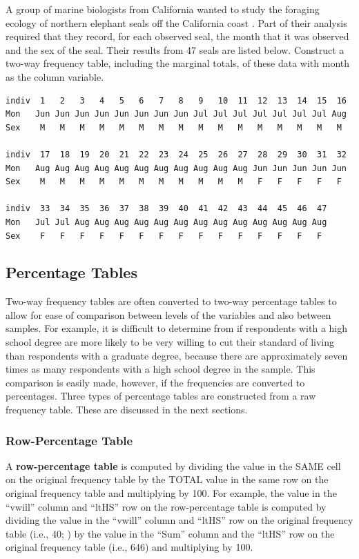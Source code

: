 \documentclass[10pt,openany]{book}\usepackage[]{graphicx}\usepackage[]{color}
\begin{document}
\vspace{-12pt}
\begin{exsection}
  \item \label{revex:cbEDASeal1} A group of marine biologists from California wanted to study the foraging ecology of northern elephant seals off the California coast \citep{LeBoeufetal2000}.  Part of their analysis required that they record, for each observed seal, the month that it was observed and the sex of the seal.  Their results from 47 seals are listed below.  Construct a two-way frequency table, including the marginal totals, of these data with month as the column variable. 
\begin{Verbatim}
indiv  1   2   3   4   5   6   7   8   9   10  11  12  13  14  15  16
Mon   Jun Jun Jun Jun Jun Jun Jun Jun Jul Jul Jul Jul Jul Jul Jul Aug
Sex    M   M   M   M   M   M   M   M   M   M   M   M   M   M   M   M

indiv  17  18  19  20  21  22  23  24  25  26  27  28  29  30  31  32
Mon   Aug Aug Aug Aug Aug Aug Aug Aug Aug Aug Aug Jun Jun Jun Jun Jun
Sex    M   M   M   M   M   M   M   M   M   M   M   F   F   F   F   F

indiv  33  34  35  36  37  38  39  40  41  42  43  44  45  46  47
Mon   Jul Jul Aug Aug Aug Aug Aug Aug Aug Aug Aug Aug Aug Aug Aug
Sex    F   F   F   F   F   F   F   F   F   F   F   F   F   F   F
\end{Verbatim}
\end{exsection}

\subsection{Percentage Tables}
Two-way frequency tables are often converted to two-way percentage tables to allow for ease of comparison between levels of the variables and also between samples.  For example, it is difficult to determine from  if respondents with a high school degree are more likely to be very willing to cut their standard of living than respondents with a graduate degree, because there are approximately seven times as many respondents with a high school degree in the sample.  This comparison is easily made, however, if the frequencies are converted to percentages.  Three types of percentage tables are constructed from a raw frequency table.  These are discussed in the next sections.

\subsubsection{Row-Percentage Table}
A \textbf{row-percentage table} is computed by dividing the value in the SAME cell on the original frequency table by the TOTAL value in the same row on the original frequency table and multiplying by 100.  For example, the value in the ``vwill'' column and ``ltHS'' row on the row-percentage table  is computed by dividing the value in the ``vwill'' column and ``ltHS'' row on the original frequency table (i.e., 40; ) by the value in the ``Sum'' column and the ``ltHS'' row on the original frequency table (i.e., 646) and multiplying by 100.
\end{document}
